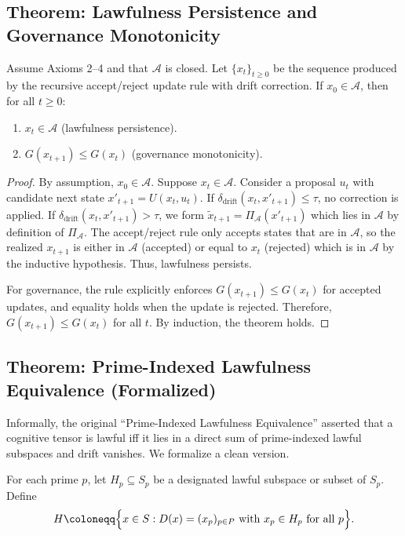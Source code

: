 \documentclass[11pt]{article}
\begin{document}
\subsection{Theorem: Lawfulness Persistence and Governance Monotonicity}

\begin{theorem}
Assume Axioms 2--4 and that \(\mathcal{A}\) is closed.%
Let \(\{x_t\}_{t \ge 0}\) be the sequence produced by the recursive accept/reject update rule with drift correction.%
If \(x_0 \in \mathcal{A}\), then for all \(t \ge 0\):
\begin{enumerate}
  \item \(x_t \in \mathcal{A}\) (lawfulness persistence).
  \item \(G(x_{t+1}) \le G(x_t)\) (governance monotonicity).
\end{enumerate}
\end{theorem}

\begin{proof}
By assumption, \(x_0 \in \mathcal{A}\).%
Suppose \(x_t \in \mathcal{A}\).%
Consider a proposal \(u_t\) with candidate next state \(x'_{t+1} = U(x_t, u_t)\).%
If \(\delta_{\mathrm{drift}}(x_t, x'_{t+1}) \le \tau\), no correction is applied.%
If \(\delta_{\mathrm{drift}}(x_t, x'_{t+1}) > \tau\), we form \(\tilde{x}_{t+1} = \Pi_{\mathcal{A}}(x'_{t+1})\) which lies in \(\mathcal{A}\) by definition of \(\Pi_{\mathcal{A}}\).%
The accept/reject rule only accepts states that are in \(\mathcal{A}\), so the realized \(x_{t+1}\) is either in \(\mathcal{A}\) (accepted) or equal to \(x_t\) (rejected) which is in \(\mathcal{A}\) by the inductive hypothesis.%
Thus, lawfulness persists.%

For governance, the rule explicitly enforces \(G(x_{t+1}) \le G(x_t)\) for accepted updates, and equality holds when the update is rejected.%
Therefore, \(G(x_{t+1}) \le G(x_t)\) for all \(t\).%
By induction, the theorem holds.
\end{proof}

\subsection{Theorem: Prime-Indexed Lawfulness Equivalence (Formalized)}

Informally, the original ``Prime-Indexed Lawfulness Equivalence'' asserted that a cognitive tensor is lawful iff it lies in a direct sum of prime-indexed lawful subspaces and drift vanishes.%
We formalize a clean version.

\begin{definition}
For each prime \(p\), let \(H_p \subseteq S_p\) be a designated lawful subspace or subset of \(S_p\).%
Define
\[
  H \coloneqq \Bigl\{ x \in S : D(x) = (x_p)_{p \in P} \text{ with } x_p \in H_p \text{ for all } p \Bigr\}.
\]
\end{definition}
\end{document}
